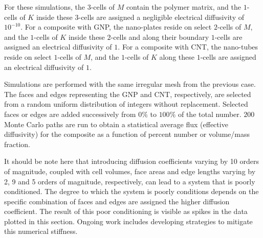 \documentclass{elsarticle}
\theoremstyle{definition}
\begin{document}
For these simulations, the $3$-cells of $M$ contain the polymer matrix, and the $1$-cells of $K$ inside these $3$-cells are assigned a negligible electrical diffusivity of $10^{-10}$. For a composite with GNP, the nano-plates reside on select $2$-cells of $M$, and the $1$-cells of $K$ inside these $2$-cells and along their boundary $1$-cells are assigned an electrical diffusivity of $1$. For a composite with CNT, the nano-tubes reside on select $1$-cells of $M$, and the $1$-cells of $K$ along these $1$-cells are assigned an electrical diffusivity of $1$.

Simulations are performed with the same irregular mesh from the previous case. The faces and edges representing the GNP and CNT, respectively, are selected from a random uniform distribution of integers without replacement. Selected faces or edges are added successively from $0\%$ to $100\%$ of the total number. $200$ Monte Carlo paths are run to obtain a statistical average flux (effective diffusivity) for the composite as a function of percent number or volume/mass fraction.

It should be note here that introducing diffusion coefficients varying by 10 orders of magnitude, coupled with cell volumes, face areas and edge lengths varying by 2, 9 and 5 orders of magnitude, respectively, can lead to a system that is poorly conditioned. The degree to which the system is poorly conditions depends on the specific combination of faces and edges are assigned the higher diffusion coefficient. The result of this poor conditioning is visible as spikes in the data plotted in this section. Ongoing work includes developing strategies to mitigate this numerical stiffness.
\end{document}
